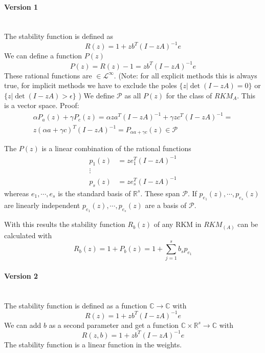 \documentclass[a4paper]{scrartcl}
\numberwithin{equation}{section}
\theoremstyle{plain}
\theoremstyle{definition}
\numberwithin{theorem}{section}
\newcommand{\R}{\mathbb{R}}
\newcommand{\CN}{\mathbb{C}}
\newcommand{\1}{\mathbbm{1}}
\begin{document}
\paragraph*{Version 1} $ $\\

The stability function is defined as 
\begin{equation}\label{eq:stab_func}
R(z) = 1 + zb^T(I - zA)^{-1}e
\end{equation}
We can define a function $P(z)$
\begin{equation}
P(z) = R(z)-1 = z b^T (I - zA)^{-1} e
\end{equation}
These rational functions are $\in \mathcal{L}^\infty$. (Note: for all explicit methods this is always true, for implicit methods we have to exclude the poles $\{z | \det(I - zA) = 0\}$ or  $\{z | \det(I - zA) > \epsilon \}$ )
We define $\mathcal{P}$ as all $P(z)$ for the class of $RKM_A$. 
This is a vector space.
Proof:
\begin{multline}
\alpha P_a(z) + \gamma P_c(z) =  \alpha z a^T (I - zA)^{-1} + \gamma z c^T (I - zA)^{-1} =\\
z (\alpha a+ \gamma c)^T (I - zA)^{-1} = P_{\alpha a + \gamma c}(z) \in \mathcal{P}
\end{multline}

The $P(z)$ is a linear combination of the rational functions
\begin{subequations}
\begin{align}
p_1(z) &= z e_1^T (I - zA)^{-1}\\
\vdots \\
p_s(z) &= z e_s^T (I - zA)^{-1}
\end{align}
\end{subequations}
whereas $e_1,\cdots,e_s$ is the standard basis of $\R^s$.
These span $\mathcal{P}$. If $p_{e_1}(z),\cdots,p_{e_s}(z)$ are linearly independent $p_{e_1}(z),\cdots,p_{e_s}(z)$ are a basis of $\mathcal{P}$.

With this results the stability function $R_b(z)$ of any RKM in $RKM_{(A)}$ can be calculated with 
\begin{equation}
R_b(z) = 1 + P_b(z) = 1 + \sum_{j = 1}^s b_s p_{e_1}
\end{equation}




\paragraph*{Version 2} $ $\\
The stability function is defined as a function $\CN \to \CN$ with 
\begin{equation}\label{eq:stab_func}
R(z) = 1 + zb^T(I - zA)^{-1}e
\end{equation}
We can add $b$ as a second parameter and get a function $\CN \times \R^s \to \CN$ with
\begin{equation}\label{eq:stab_func}
R(z,b) = 1 + zb^T(I - zA)^{-1}e
\end{equation}
The stability function is a linear function in the weights.
\end{document}
